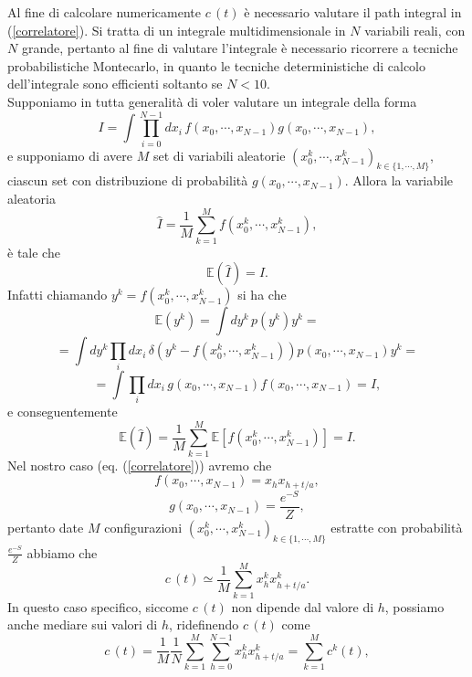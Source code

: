 \documentclass{article}
\begin{document}
Al fine di calcolare numericamente $c\,(t)$ è necessario valutare il path integral in (\ref{correlatore}). Si tratta di un integrale multidimensionale in $N$ variabili reali, con $N$ grande, pertanto al fine di valutare l'integrale è necessario ricorrere a tecniche probabilistiche Montecarlo, in quanto le tecniche deterministiche di calcolo dell'integrale sono efficienti soltanto se $N<10$.\\ Supponiamo in tutta generalità di voler valutare un integrale della forma 
\begin{equation}
    I=\int \prod_{i=0}^{N-1} dx_i\, {f(x_0,\cdots, x_{N-1})}{g(x_0,\cdots, x_{N-1})},
\end{equation}
e supponiamo di avere $M$ set di variabili aleatorie $(x_0^k,\cdots, x_{N-1}^k)_{k\in\{1,\cdots,M\}}$, ciascun set con distribuzione di probabilità $g(x_0,\cdots, x_{N-1})$. Allora la variabile aleatoria 
\begin{equation}
    \hat{I}=\frac{1}{M}\sum_{k=1}^{M}f(x_0^k,\cdots,x_{N-1}^k),
\end{equation}
è tale che 
\begin{equation}
    \mathbb{E}(\hat{I})=I.
\end{equation}
Infatti chiamando $y^k=f(x_0^k,\cdots,x_{N-1}^k)$ si ha che 
$$\mathbb{E}(y^k)=\int d{y^k}\, p(y^k){y^k}=$$$$=\int dy^k\prod_i dx_i\, \delta\left(y^k-f(x_0^k,\cdots,x_{N-1}^k)\right)p(x_0,\cdots, x_{N-1})y^k=$$$$=\int \prod_i dx_i\, {g(x_0,\cdots, x_{N-1})}{f(x_0,\cdots, x_{N-1})}=I,$$
e conseguentemente 
\begin{equation}
    \mathbb{E}(\hat{I})=\frac{1}{M}\sum_{k=1}^{M}\mathbb{E}[f(x_0^k,\cdots,x_{N-1}^k)]=I.
\end{equation}
Nel nostro caso (eq. (\ref{correlatore})) avremo che 
\begin{equation}
    f(x_0,\cdots, x_{N-1})=x_{h}x_{h+t/a},
\end{equation}
\begin{equation}
    g(x_0,\cdots, x_{N-1})=\frac{e^{-S}}{Z},
\end{equation}
pertanto date $M$ configurazioni $(x_0^k,\cdots, x_{N-1}^k)_{k\in\{1,\cdots,M\}}$ estratte con probabilità $\frac{e^{-S}}{Z}$ abbiamo che 
\begin{equation}
    c\,(t)\simeq\frac{1}{M}\sum_{k=1}^{M} x_{h}^kx_{h+t/a}^k.
\end{equation}
In questo caso specifico, siccome $c\,(t)$ non dipende dal valore di $h$, possiamo anche mediare sui valori di $h$, ridefinendo $c\,(t)$ come 
\begin{equation}
    c\,(t)=\frac{1}{M}\frac{1}{N}\sum_{k=1}^{M}\sum_{h=0}^{N-1} x_{h}^kx_{h+t/a}^k=\sum_{k=1}^{M}c^k(t),
\end{equation}
\end{document}
